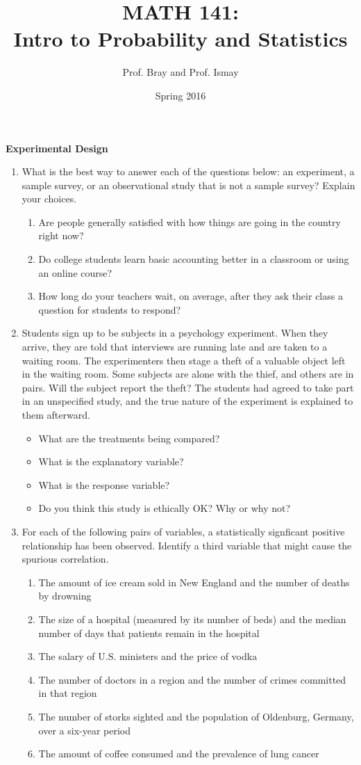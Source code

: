 \documentclass[10pt]{article}\usepackage[]{graphicx}\usepackage[]{color}
\title{MATH 141:\\Intro to Probability and Statistics}
\author{Prof. Bray and Prof. Ismay}
\date{Spring 2016}
\newcommand{\ans}{\vspace{0.25in}}
\begin{document}

\textbf{Experimental Design}

\begin{enumerate}
  \item What is the best way to answer each of the questions below: an experiment, a sample survey, or an observational study that is not a sample survey? Explain your choices.
  \begin{enumerate}
    \itemsep0.5in
    \item Are people generally satisfied with how things are going in the country right now?
    \item Do college students learn basic accounting better in a classroom or using an online course?
    \item How long do your teachers wait, on average, after they ask their class a question for students to respond?
    \ans \ans
  \end{enumerate}
  
  \item Students sign up to be subjects in a psychology experiment. When they arrive, they are told that interviews are running late and are taken to a waiting room. The experimenters then stage a theft of a valuable object left in the waiting room. Some subjects are alone with the thief, and others are in pairs. Will the subject report the theft? The students had agreed to take part in an unspecified study, and the true nature of the experiment is explained to them afterward. 
  
\begin{itemize}
    \itemsep0.2in
  \item What are the treatments being compared?
  \item What is the explanatory variable?
  \item What is the response variable?
  \item Do you think this study is ethically OK? Why or why not?
\end{itemize}

\ans
\ans

\item For each of the following pairs of variables, a statistically signficant positive relationship has been observed. Identify a third variable that might cause the spurious correlation.
\begin{enumerate}
  \itemsep0.2in
  \item The amount of ice cream sold in New England and the number of deaths by drowning
  \item The size of a hospital (measured by its number of beds) and the median number of days that patients remain in the hospital
  \item The salary of U.S. ministers and the price of vodka
  \item The number of doctors in a region and the number of crimes committed in that region
  \item The number of storks sighted and the population of Oldenburg, Germany, over a six-year period
  \item The amount of coffee consumed and the prevalence of lung cancer
\end{enumerate}


\end{enumerate}
\end{document}
